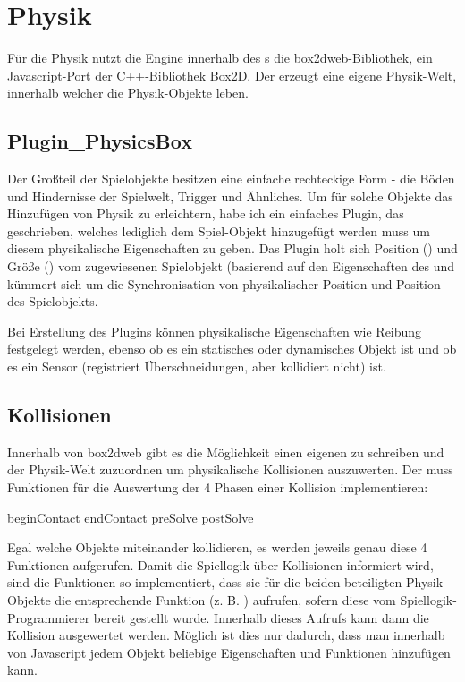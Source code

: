 \chapter{Physik}

Für die Physik nutzt die Engine innerhalb des s die box2dweb-Bibliothek, ein Javascript-Port der C++-Bibliothek Box2D. Der  erzeugt eine eigene Physik-Welt, innerhalb welcher die Physik-Objekte leben.

\section{Plugin\_PhysicsBox}

Der Großteil der Spielobjekte besitzen eine einfache rechteckige Form - die Böden und Hindernisse der Spielwelt, Trigger und Ähnliches. Um für solche Objekte das Hinzufügen von Physik zu erleichtern, habe ich ein einfaches Plugin, das  geschrieben, welches lediglich dem Spiel-Objekt hinzugefügt werden muss um diesem physikalische Eigenschaften zu geben. Das Plugin holt sich Position () und Größe () vom zugewiesenen Spielobjekt (basierend auf den Eigenschaften des  und kümmert sich um die Synchronisation von physikalischer Position und Position des Spielobjekts.

Bei Erstellung des Plugins können physikalische Eigenschaften wie Reibung festgelegt werden, ebenso ob es ein statisches oder dynamisches Objekt ist und ob es ein Sensor (registriert Überschneidungen, aber kollidiert nicht) ist.

\section{Kollisionen}

Innerhalb von box2dweb gibt es die Möglichkeit einen eigenen  zu schreiben und der Physik-Welt zuzuordnen um physikalische Kollisionen auszuwerten. Der  muss Funktionen für die Auswertung der 4 Phasen einer Kollision implementieren:

beginContact
endContact
preSolve
postSolve

Egal welche Objekte miteinander kollidieren, es werden jeweils genau diese 4 Funktionen aufgerufen. Damit die Spiellogik über Kollisionen informiert wird, sind die Funktionen so implementiert, dass sie für die beiden beteiligten Physik-Objekte die entsprechende Funktion (z. B. ) aufrufen, sofern diese vom Spiellogik-Programmierer bereit gestellt wurde. Innerhalb dieses Aufrufs kann dann die Kollision ausgewertet werden. Möglich ist dies nur dadurch, dass man innerhalb von Javascript jedem Objekt beliebige Eigenschaften und Funktionen hinzufügen kann.

